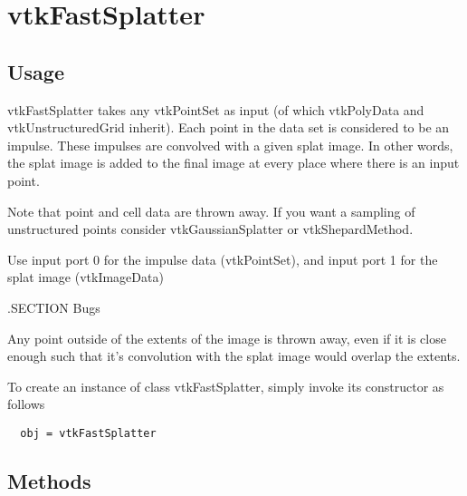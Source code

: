 \section{vtkFastSplatter}

\subsection{Usage}


 vtkFastSplatter takes any vtkPointSet as input (of which vtkPolyData and
 vtkUnstructuredGrid inherit).  Each point in the data set is considered to be
 an impulse.  These impulses are convolved with a given splat image.  In other
 words, the splat image is added to the final image at every place where there
 is an input point.

 Note that point and cell data are thrown away.  If you want a sampling
 of unstructured points consider vtkGaussianSplatter or vtkShepardMethod.

 Use input port 0 for the impulse data (vtkPointSet), and input port 1 for
 the splat image (vtkImageData)

 .SECTION Bugs

 Any point outside of the extents of the image is thrown away, even if it is
 close enough such that it's convolution with the splat image would overlap
 the extents.


To create an instance of class vtkFastSplatter, simply
invoke its constructor as follows
\begin{verbatim}
  obj = vtkFastSplatter
\end{verbatim}
\subsection{Methods}

